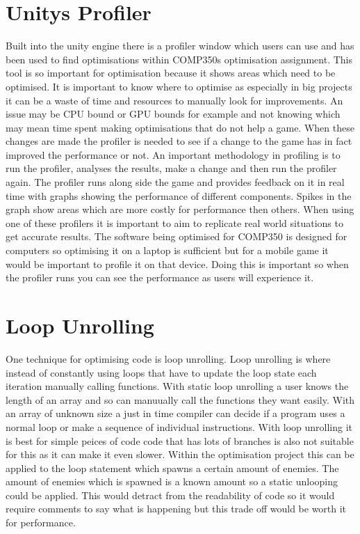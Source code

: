 \documentclass[journal]{IEEEtran}
\begin{document}
\section{Unitys Profiler}
Built into the unity engine there is a profiler window which users can use and has been used to find optimisations within COMP350s optimisation assignment.
This tool is so important for optimisation because it shows areas which need to be optimised.
It is important to know where to optimise as especially in big projects it can be a waste of time and resources to manually look for improvements.%
An issue may be CPU bound or GPU bounds for example and not knowing which may mean time spent making optimisations that do not help a game.
When these changes are made the profiler is needed to see if a change to the game has in fact improved the performance or not.%
An important methodology in profiling is to run the profiler, analyses the results, make a change and then run the profiler again.%
The profiler runs along side the game and provides feedback on it in real time with graphs showing the performance of different components.%
Spikes in the graph show areas which are more costly for performance then others.
When using one of these profilers it is important to aim to replicate real world situations to get accurate results. 
The software being optimised for COMP350 is designed for computers so optimising it on a laptop is sufficient but for a mobile game it would be important to profile it on that device.
Doing this is important so when the profiler runs you can see the performance as users will experience it. %


\section{Loop Unrolling}
One technique for optimising code is loop unrolling. Loop unrolling is where instead of constantly using loops that have to update the loop state each iteration manually calling functions. With static loop unrolling a user knows the length of an array and so can manuually call the functions they want easily. With an array of unknown size a just in time compiler can decide if a program uses a normal loop or make a sequence of individual instructions. With loop unrolling it is best for simple peices of code code that has lots of branches is also not suitable for this as it can make it even slower.%
Within the optimisation project this can be applied to the loop statement which spawns a certain amount of enemies. The amount of enemies which is spawned is a known amount so a static unlooping could be applied.
This would detract from the readability of code so it would require comments to say what is happening but this trade off would be worth it for performance.%
\end{document}
